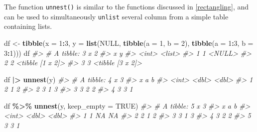 \documentclass[
]{book}
\newenvironment{Shaded}{\begin{snugshade}}{\end{snugshade}}
\newcommand{\AttributeTok}[1]{\textcolor[rgb]{0.13,0.29,0.53}{#1}}
\newcommand{\CommentTok}[1]{\textcolor[rgb]{0.56,0.35,0.01}{\textit{#1}}}
\newcommand{\ConstantTok}[1]{\textcolor[rgb]{0.56,0.35,0.01}{#1}}
\newcommand{\DecValTok}[1]{\textcolor[rgb]{0.00,0.00,0.81}{#1}}
\newcommand{\FunctionTok}[1]{\textcolor[rgb]{0.13,0.29,0.53}{\textbf{#1}}}
\newcommand{\NormalTok}[1]{#1}
\newcommand{\OtherTok}[1]{\textcolor[rgb]{0.56,0.35,0.01}{#1}}
\newcommand{\SpecialCharTok}[1]{\textcolor[rgb]{0.81,0.36,0.00}{\textbf{#1}}}
\begin{document}
The function \texttt{unnest()} is similar to the functions discussed in \ref{rectangling}, and can be used to simultaneously \texttt{unlist} several column from a simple table containing lists.

\begin{Shaded}
\begin{Highlighting}[]
\NormalTok{df }\OtherTok{\textless{}{-}} \FunctionTok{tibble}\NormalTok{(}\AttributeTok{x =} \DecValTok{1}\SpecialCharTok{:}\DecValTok{3}\NormalTok{,}
             \AttributeTok{y =} \FunctionTok{list}\NormalTok{(}\ConstantTok{NULL}\NormalTok{,}
                      \FunctionTok{tibble}\NormalTok{(}\AttributeTok{a =} \DecValTok{1}\NormalTok{, }\AttributeTok{b =} \DecValTok{2}\NormalTok{),}
                      \FunctionTok{tibble}\NormalTok{(}\AttributeTok{a =} \DecValTok{1}\SpecialCharTok{:}\DecValTok{3}\NormalTok{, }\AttributeTok{b =} \DecValTok{3}\SpecialCharTok{:}\DecValTok{1}\NormalTok{)))}
\NormalTok{df}
\CommentTok{\#\textgreater{} \# A tibble: 3 x 2}
\CommentTok{\#\textgreater{}       x y               }
\CommentTok{\#\textgreater{}   \textless{}int\textgreater{} \textless{}list\textgreater{}          }
\CommentTok{\#\textgreater{} 1     1 \textless{}NULL\textgreater{}          }
\CommentTok{\#\textgreater{} 2     2 \textless{}tibble [1 x 2]\textgreater{}}
\CommentTok{\#\textgreater{} 3     3 \textless{}tibble [3 x 2]\textgreater{}}
  
\NormalTok{df }\SpecialCharTok{|\textgreater{}} \FunctionTok{unnest}\NormalTok{(y)}
\CommentTok{\#\textgreater{} \# A tibble: 4 x 3}
\CommentTok{\#\textgreater{}       x     a     b}
\CommentTok{\#\textgreater{}   \textless{}int\textgreater{} \textless{}dbl\textgreater{} \textless{}dbl\textgreater{}}
\CommentTok{\#\textgreater{} 1     2     1     2}
\CommentTok{\#\textgreater{} 2     3     1     3}
\CommentTok{\#\textgreater{} 3     3     2     2}
\CommentTok{\#\textgreater{} 4     3     3     1}

\NormalTok{df }\SpecialCharTok{\%\textgreater{}\%} \FunctionTok{unnest}\NormalTok{(y, }\AttributeTok{keep\_empty =} \ConstantTok{TRUE}\NormalTok{)}
\CommentTok{\#\textgreater{} \# A tibble: 5 x 3}
\CommentTok{\#\textgreater{}       x     a     b}
\CommentTok{\#\textgreater{}   \textless{}int\textgreater{} \textless{}dbl\textgreater{} \textless{}dbl\textgreater{}}
\CommentTok{\#\textgreater{} 1     1    NA    NA}
\CommentTok{\#\textgreater{} 2     2     1     2}
\CommentTok{\#\textgreater{} 3     3     1     3}
\CommentTok{\#\textgreater{} 4     3     2     2}
\CommentTok{\#\textgreater{} 5     3     3     1}
  

\end{Highlighting}
\end{Shaded}
\end{document}

